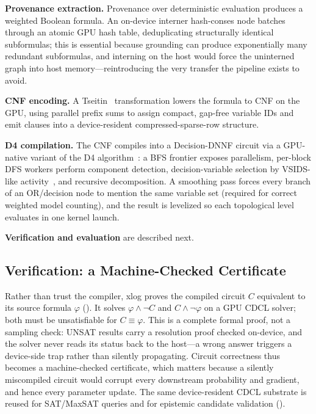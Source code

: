 \textbf{Provenance extraction.} Provenance over deterministic evaluation produces a weighted Boolean formula. An on-device interner hash-conses node batches through an atomic GPU hash table, deduplicating structurally identical subformulas; this is essential because grounding can produce exponentially many redundant subformulas, and interning on the host would force the uninterned graph into host memory---reintroducing the very transfer the pipeline exists to avoid.

\textbf{CNF encoding.} A Tseitin~\cite{tseitin} transformation lowers the formula to CNF on the GPU, using parallel prefix sums to assign compact, gap-free variable IDs and emit clauses into a device-resident compressed-sparse-row structure.

\textbf{D4 compilation.} The CNF compiles into a Decision-DNNF circuit via a GPU-native variant of the D4 algorithm~\cite{d4compiler}: a BFS frontier exposes parallelism, per-block DFS workers perform component detection, decision-variable selection by VSIDS-like activity~\cite{grasp}, and recursive decomposition. A smoothing pass forces every branch of an OR/decision node to mention the same variable set (required for correct weighted model counting), and the result is levelized so each topological level evaluates in one kernel launch.

\textbf{Verification and evaluation} are described next.

\subsection{Verification: a Machine-Checked Certificate}

Rather than trust the compiler, xlog proves the compiled circuit $C$ equivalent to its source formula $\varphi$ (). It solves $\varphi \land \lnot C$ and $C \land \lnot \varphi$ on a GPU CDCL solver; both must be unsatisfiable for $C \equiv \varphi$. This is a complete formal proof, not a sampling check: UNSAT results carry a resolution proof checked on-device, and the solver never reads its status back to the host---a wrong answer triggers a device-side trap rather than silently propagating. Circuit correctness thus becomes a machine-checked certificate, which matters because a silently miscompiled circuit would corrupt every downstream probability and gradient, and hence every parameter update. The same device-resident CDCL substrate is reused for SAT/MaxSAT queries and for epistemic candidate validation ().

